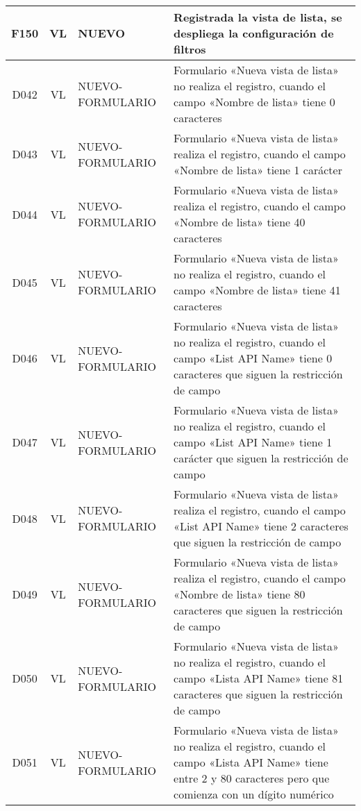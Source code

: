 \begin{landscape}
{\begin{longtable}[htb]{|c|c|p{3.8cm}|p{15.2cm}|}
\scriptsize{F150} & \scriptsize{VL} & \scriptsize{NUEVO} & \scriptsize{Registrada la vista de lista, se despliega la configuración de filtros} \\ \hline
\scriptsize{D042} & \scriptsize{VL} & \scriptsize{NUEVO-FORMULARIO} & \scriptsize{Formulario «Nueva vista de lista» no realiza el registro, cuando el campo «Nombre de lista» tiene 0 caracteres} \\ \hline
\scriptsize{D043} & \scriptsize{VL} & \scriptsize{NUEVO-FORMULARIO} & \scriptsize{Formulario «Nueva vista de lista» realiza el registro, cuando el campo «Nombre de lista» tiene 1 carácter} \\ \hline
\scriptsize{D044} & \scriptsize{VL} & \scriptsize{NUEVO-FORMULARIO} & \scriptsize{Formulario «Nueva vista de lista» realiza el registro, cuando el campo «Nombre de lista» tiene 40 caracteres} \\ \hline
\scriptsize{D045} & \scriptsize{VL} & \scriptsize{NUEVO-FORMULARIO} & \scriptsize{Formulario «Nueva vista de lista» no realiza el registro, cuando el campo «Nombre de lista» tiene 41 caracteres} \\ \hline
\scriptsize{D046} & \scriptsize{VL} & \scriptsize{NUEVO-FORMULARIO} & \scriptsize{Formulario «Nueva vista de lista» no realiza el registro, cuando el campo «List API Name» tiene 0 caracteres que siguen la restricción de campo} \\ \hline
\scriptsize{D047} & \scriptsize{VL} & \scriptsize{NUEVO-FORMULARIO} & \scriptsize{Formulario «Nueva vista de lista» no realiza el registro, cuando el campo «List API Name» tiene 1 carácter que siguen la restricción de campo} \\ \hline
\scriptsize{D048} & \scriptsize{VL} & \scriptsize{NUEVO-FORMULARIO} & \scriptsize{Formulario «Nueva vista de lista» realiza el registro, cuando el campo «List API Name» tiene 2 caracteres que siguen la restricción de campo} \\ \hline
\scriptsize{D049} & \scriptsize{VL} & \scriptsize{NUEVO-FORMULARIO} & \scriptsize{Formulario «Nueva vista de lista» realiza el registro, cuando el campo «Nombre de lista» tiene 80 caracteres que siguen la restricción de campo} \\ \hline
\scriptsize{D050} & \scriptsize{VL} & \scriptsize{NUEVO-FORMULARIO} & \scriptsize{Formulario «Nueva vista de lista» no realiza el registro, cuando el campo «Lista API Name» tiene 81 caracteres que siguen la restricción de campo} \\ \hline
\scriptsize{D051} & \scriptsize{VL} & \scriptsize{NUEVO-FORMULARIO} & \scriptsize{Formulario «Nueva vista de lista» no realiza el registro, cuando el campo «Lista API Name» tiene entre 2 y 80 caracteres pero que comienza con un dígito numérico} \\ \hline

\end{longtable}}
\end{landscape}
